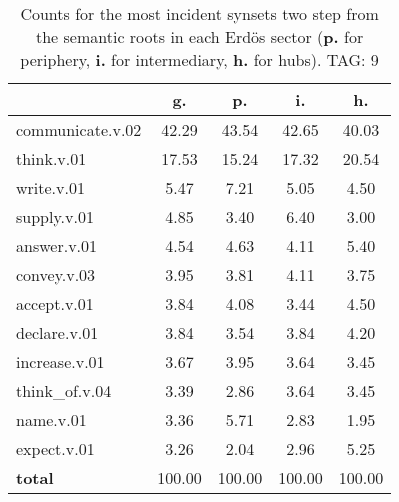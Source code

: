 \begin{table}[h!]
\begin{center}
\begin{tabular}{| l | c | c | c | c |}\hline
 & g. & p. & i. & h. \\\hline
communicate.v.02 & 42.29  & 43.54  & 42.65  & 40.03 \\\hline
think.v.01 & 17.53  & 15.24  & 17.32  & 20.54 \\\hline
write.v.01 & 5.47  & 7.21  & 5.05  & 4.50 \\\hline
supply.v.01 & 4.85  & 3.40  & 6.40  & 3.00 \\\hline
answer.v.01 & 4.54  & 4.63  & 4.11  & 5.40 \\\hline
convey.v.03 & 3.95  & 3.81  & 4.11  & 3.75 \\\hline
accept.v.01 & 3.84  & 4.08  & 3.44  & 4.50 \\\hline
declare.v.01 & 3.84  & 3.54  & 3.84  & 4.20 \\\hline
increase.v.01 & 3.67  & 3.95  & 3.64  & 3.45 \\\hline
think\_of.v.04 & 3.39  & 2.86  & 3.64  & 3.45 \\\hline
name.v.01 & 3.36  & 5.71  & 2.83  & 1.95 \\\hline
expect.v.01 & 3.26  & 2.04  & 2.96  & 5.25 \\\hline
{{\bf total}} & 100.00  & 100.00  & 100.00  & 100.00 \\\hline
\end{tabular}
\caption{Counts for the most incident synsets two step from the semantic roots in each Erd\"os sector ({\bf p.} for periphery, {\bf i.} for intermediary, {\bf h.} for hubs). TAG: 9}
\end{center}
\end{table}